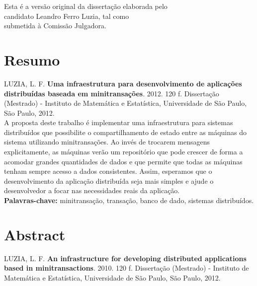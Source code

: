 \documentclass[11pt,twoside,a4paper]{book}
\begin{document}
    \vskip 2cm

    \begin{flushright}
	Esta é a versão original da dissertação elaborada pelo\\
	candidato Leandro Ferro Luzia, tal como \\
	submetida à Comissão Julgadora.
    \end{flushright}

\pagebreak



\chapter*{Resumo}

\noindent LUZIA, L. F. \textbf{Uma infraestrutura para desenvolvimento de aplicações distribuídas baseada em minitransações}. 
2012. 120 f.
Dissertação (Mestrado) - Instituto de Matemática e Estatística,
Universidade de São Paulo, São Paulo, 2012.
\\

A proposta deste trabalho é implementar uma infraestrutura para sistemas distribuídos que possibilite o compartilhamento de estado entre as máquinas do sistema utilizando minitransações. Ao invés de trocarem mensagens explicitamente, as máquinas verão um repositório que pode crescer de forma a acomodar grandes quantidades de dados e que permite que todas as máquinas tenham sempre acesso a dados consistentes. Assim, esperamos que o desenvolvimento da aplicação distribuída seja mais simples e ajude o desenvolvedor a focar nas necessidades reais da aplicação.
\\

\noindent \textbf{Palavras-chave:} minitransação, transação, banco de dado, sistemas distribuídos.

\chapter*{Abstract}
\noindent LUZIA, L. F. \textbf{An infrastructure for developing distributed applications based in minitransactions}. 
2010. 120 f.
Dissertação (Mestrado) - Instituto de Matemática e Estatística,
Universidade de São Paulo, São Paulo, 2012.
\\
\end{document}
